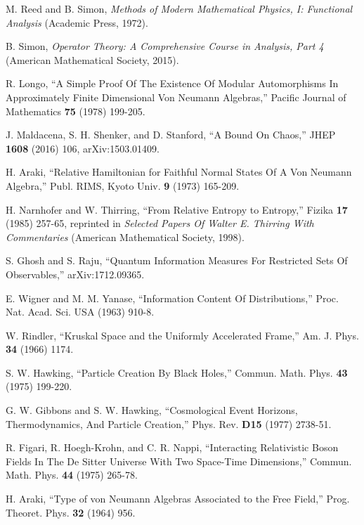 \documentclass[12pt]{article}
\numberwithin{equation}{section}
\begin{document}
\begin{thebibliography}{99}
M. Reed and B. Simon, {\it Methods of Modern Mathematical Physics, I: Functional Analysis} (Academic Press, 1972).

B. Simon, {\it Operator Theory: A Comprehensive Course in Analysis, Part 4} (American Mathematical Society, 2015).

R. Longo, ``A Simple Proof Of The Existence Of Modular Automorphisms In Approximately Finite Dimensional Von Neumann Algebras,''
Pacific Journal of Mathematics {\bf 75}  (1978) 199-205.



J. Maldacena, S. H. Shenker, and D. Stanford, ``A Bound On Chaos,''
JHEP {\bf 1608} (2016) 106, arXiv:1503.01409.


H. Araki, ``Relative Hamiltonian for Faithful Normal States Of A Von Neumann Algebra,'' Publ. RIMS, Kyoto Univ. {\bf 9} (1973) 165-209.

H. Narnhofer and W. Thirring, ``From Relative Entropy to Entropy,'' Fizika {\bf 17} (1985) 257-65,
reprinted  in {\it Selected Papers Of Walter E. Thirring With Commentaries}
(American Mathematical Society, 1998).

S. Ghosh and S. Raju, ``Quantum Information Measures For Restricted Sets Of Observables,'' arXiv:1712.09365.

E. Wigner and M. M. Yanase, ``Information Content Of Distributions,'' Proc. Nat. Acad. Sci. USA (1963) 910-8.

W. Rindler, ``Kruskal Space and the Uniformly Accelerated Frame,'' Am. J. Phys. {\bf 34} (1966) 1174.


S. W. Hawking, ``Particle Creation By Black Holes,'' Commun. Math. Phys. {\bf 43} (1975) 199-220.



G. W. Gibbons and S. W. Hawking, ``Cosmological Event Horizons, Thermodynamics, And Particle Creation,'' Phys. Rev. {\bf D15} (1977)
2738-51.

R. Figari, R. Hoegh-Krohn, and C. R. Nappi, ``Interacting Relativistic
Boson Fields In The De Sitter Universe With Two Space-Time Dimensions,''
Commun. Math. Phys. {\bf 44} (1975) 265-78.






H. Araki, ``Type of von Neumann Algebras Associated to the Free Field,'' Prog. Theoret. Phys. {\bf 32} (1964) 956.


\end{thebibliography}
\end{document}
